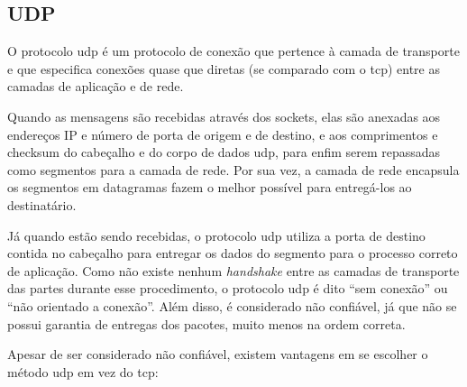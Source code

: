 
\subsection*{UDP}

O protocolo \gls*{udp} é um protocolo de conexão que pertence à camada de transporte e
que especifica conexões quase que diretas (se comparado com o \gls*{tcp}) entre as
camadas de aplicação e de rede.

Quando as mensagens são recebidas através dos \glspl{socket}, elas são anexadas aos
endereços IP e número de porta de origem e de destino, e aos comprimentos e
\gls{checksum} do cabeçalho e do corpo de dados \gls*{udp}, para enfim serem repassadas
como segmentos para a camada de rede. Por sua vez, a camada de rede encapsula os
segmentos em datagramas fazem o melhor possível para entregá-los ao destinatário.

Já quando estão sendo recebidas, o protocolo \gls*{udp} utiliza a porta de destino
contida no cabeçalho para entregar os dados do segmento para o processo correto de
aplicação. Como não existe nenhum \emph{handshake} entre as camadas de transporte das
partes durante esse procedimento, o protocolo \gls*{udp} é dito ``sem conexão'' ou ``não
orientado a conexão''. Além disso, é considerado não confiável, já que não se possui
garantia de entregas dos pacotes, muito menos na ordem correta.

Apesar de ser considerado não confiável, existem vantagens em se escolher o método
\gls*{udp} em vez do \gls*{tcp}:

